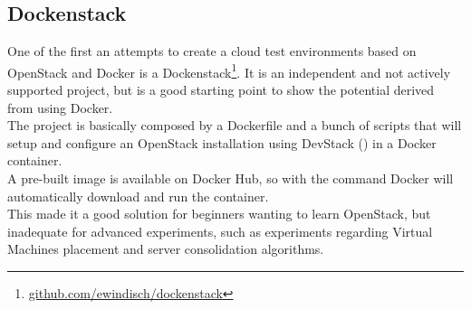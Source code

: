 
\subsection{Dockenstack}
\label{sub:sota_dockenstack}
One of the first an attempts to create a cloud test environments based on OpenStack and Docker is a Dockenstack\footnote{\url{github.com/ewindisch/dockenstack}}. It is an independent and not actively supported project, but is a good starting point to show the potential derived from using Docker.\\
The project is basically composed by a Dockerfile and a bunch of scripts that will setup and configure an OpenStack installation using DevStack () in a Docker container.\\
A pre-built image is available on Docker Hub, so with the command  Docker will automatically download and run the container.\\
This made it a good solution for beginners wanting to learn OpenStack, but inadequate for advanced experiments, such as experiments regarding Virtual Machines placement and server consolidation algorithms.

